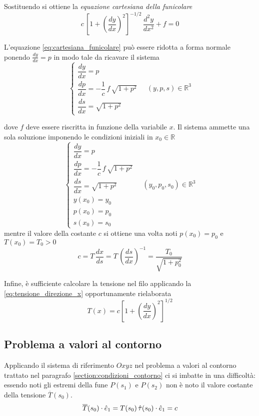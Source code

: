Sostituendo si ottiene la \emph{equazione cartesiana della funicolare}
\begin{equation}
	\label{eq:cartesiana_funicolare}
	c\,\left[1+ \left(\dfrac{dy}{dx}\right)^2\right]^{-1/2}\,\dfrac{d^2 y}{dx^2} + f = 0
\end{equation}

L'equazione \eqref{eq:cartesiana_funicolare} può essere ridotta a forma normale ponendo $\frac{dy}{dx} = p$ in modo tale da ricavare il sistema
\[
\begin{cases}
	\dfrac{dy}{dx} = p\\[1.5ex]	
	\dfrac{dp}{dx} = -\dfrac{1}{c}\,f\,\sqrt{1+p^2}\\[1.5ex]
	\dfrac{ds}{dx} = \sqrt{1+p^2}
\end{cases}\quad (y,p,s)\in\mathbb{R}^3
\]

dove $f$ deve essere riscritta in funzione della variabile $x$. Il sistema ammette una sola soluzione imponendo le condizioni iniziali in $x_0\in\mathbb{R}$
\[
\begin{cases}
	\dfrac{dy}{dx} = p\\[1.5ex]	
	\dfrac{dp}{dx} = -\dfrac{1}{c}\,f\,\sqrt{1+p^2}\\[1.5ex]
	\dfrac{ds}{dx} = \sqrt{1+p^2}\\[1.5ex]
	y(x_0) = y_0\\
	p(x_0) = p_0\\
	s(x_0) = s_0
\end{cases}\quad (y_0,p_0,s_0)\in\mathbb{R}^3
\]
mentre il valore della costante $c$ si ottiene una volta noti $p(x_0) = p_0$ e $T(x_0) = T_0>0$
\[
c = T\,\dfrac{dx}{ds} = T\,\left(\dfrac{ds}{dx}\right)^{-1} = \dfrac{T_0}{\sqrt{1+p_0^2}}
\]

Infine, è sufficiente calcolare la tensione nel filo applicando la \eqref{eq:tensione_direzione_x} opportunamente rielaborata
\begin{equation}
	\label{eq:calcolo_tensione}
	T(x) = c\left[1+ \left(\dfrac{dy}{dx}\right)^2\right]^{1/2}
\end{equation}

\subsection{Problema a valori al contorno}
Applicando il sistema di riferimento $Oxyz$ nel problema a valori al contorno trattato nel paragrafo \ref{section:condizioni_contorno} ci si imbatte in una difficoltà: essendo noti gli estremi della fune $P(s_1)$ e $P(s_2)$ non è noto il valore costante della tensione $\overline{T}(s_0)$. 
\[
\overline{T}(s_0)\cdot \hat{e}_1	= T(s_0)\,\hat{\tau} (s_0)\cdot\hat{e}_1 = c 
\]

